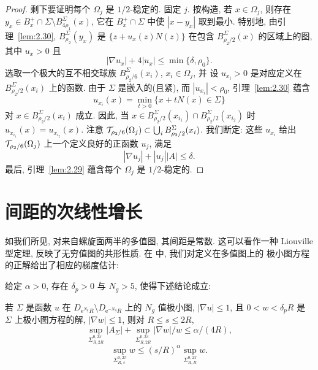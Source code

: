 \begin{proof}
剩下要证明每个 $\Omega_j$ 是 $1/2$-稳定的. 固定 $j$. 按构造, 若
$x\in\Omega_j$, 则存在 $y_x\in B_x^{+}\cap\Sigma\setminus
B_{4\rho_1}^{\Sigma}(x)$, 它在 $B_x^{+}\cap\Sigma$ 中使 $|x-y_x|$ 取到最小.
特别地, 由引理~\ref{lem:2.30}, $B_{\rho_2}^{\Sigma}(y_x)$ 是
$\{z+u_x(z)N(z)\}$ 在包含 $B_{\rho_2/2}^{\Sigma}(x)$ 的区域上的图, 其中
$u_x>0$ 且
\begin{equation}
|\nabla u_x|+4|u_x|\leq\min\{\delta,\rho_0\}.
\label{eq:2.153}
\end{equation}
选取一个极大的互不相交球族 $B_{\rho_2/6}^{\Sigma}(x_i)$, $x_i\in\Omega_j$, 并
设 $u_{x_i}>0$ 是对应定义在 $B_{\rho_2/2}^{\Sigma}(x_i)$ 上的函数. 由于 $\Sigma$
是嵌入的(且紧), 而 $|u_{x_i}|<\rho_0$, 引理~\ref{lem:2.30} 蕴含
\[
u_{x_i}(x)=\min_{t>0}\{x+tN(x)\in\Sigma\}
\]
对 $x\in B_{\rho_2/2}^{\Sigma}(x_i)$ 成立. 因此, 当
$x\in B_{\rho_2/2}^{\Sigma}(x_{i_1})\cap B_{\rho_2/2}^{\Sigma}(x_{i_2})$ 时
$u_{x_{i_1}}(x)=u_{x_{i_2}}(x)$. 注意
$\mathcal{T}_{\rho_2/6}(\Omega_j)\subset\bigcup_i
B_{\rho_2/2}^{\Sigma}(x_i)$. 我们断定: 这些 $u_{x_i}$ 给出
$\mathcal{T}_{\rho_2/6}(\Omega_j)$ 上一个定义良好的正函数 $u_j$, 满足
\begin{equation}
|\nabla u_j|+|u_j||A|\leq\delta.
\label{eq:2.154}
\end{equation}
最后, 引理~\ref{lem:2.29} 蕴含每个 $\Omega_j$ 是 $1/2$-稳定的.
\end{proof}

\section{间距的次线性增长}
\label{sec:2.8}

如我们所见, 对来自螺旋面两半的多值图, 其间距是常数. 这可以看作一种 Liouville
型定理, 反映了无穷值图的共形性质. 在 \cite{CM3} 中, 我们对定义在多值图上的
极小图方程的正解给出了相应的梯度估计:

\begin{theorem}
\label{thm:2.33}
给定 $\alpha>0$, 存在 $\delta_p>0$ 与 $N_g>5$, 使得下述结论成立:

若 $\Sigma$ 是函数 $u$ 在 $D_{\mathrm{e}^{N_g}R}\setminus
D_{\mathrm{e}^{-N_g}R}$ 上的 $N_g$ 值极小图, $|\nabla u|\leq1$, 且
$0<w<\delta_pR$ 是 $\Sigma$ 上极小图方程的解, $|\nabla w|\leq1$, 则对
$R\leq s\leq2R$,
\begin{equation}
\sup_{\Sigma^{0,2\pi}_{R,2R}}|A_{\Sigma}|
 +\sup_{\Sigma^{0,2\pi}_{R,2R}}|\nabla w|/w
 \leq\alpha/(4R),
\label{eq:2.155}
\end{equation}
\begin{equation}
\sup_{\Sigma^{0,2\pi}_{R,s}}w
 \leq(s/R)^{\alpha}\sup_{\Sigma^{0,2\pi}_{R,R}}w.
\label{eq:2.156}
\end{equation}
\end{theorem}

